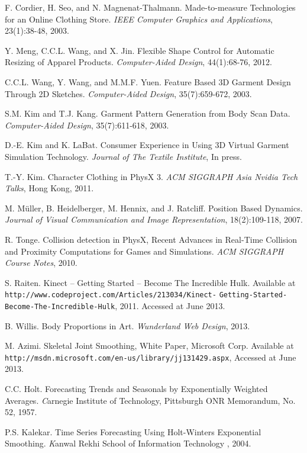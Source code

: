 \documentclass[number,preprint,review,12pt]{elsarticle}
\begin{document}
\begin{thebibliography}{}
F. Cordier, H. Seo, and N. Magnenat-Thalmann.
Made-to-measure Technologies for an Online Clothing Store. 
\textit{IEEE Computer Graphics and Applications}, 23(1):38-48, 2003. 

Y. Meng, C.C.L. Wang, and X. Jin.
Flexible Shape Control for Automatic Resizing of Apparel Products.
\textit{Computer-Aided Design}, 44(1):68-76, 2012. 
    
C.C.L. Wang, Y. Wang, and M.M.F. Yuen.
Feature Based 3D Garment Design Through 2D Sketches.
\textit{Computer-Aided Design}, 35(7):659-672, 2003. 

S.M. Kim and T.J. Kang.
Garment Pattern Generation from Body Scan Data.
\textit{Computer-Aided Design}, 35(7):611-618, 2003. 

D.-E. Kim  and K. LaBat. Consumer Experience in Using 3D Virtual Garment Simulation Technology. 
\textit{Journal of The Textile Institute}, In press.

T.-Y. Kim. Character Clothing in PhysX 3. \textit{ACM SIGGRAPH Asia Nvidia Tech Talks}, Hong Kong, 2011.

M. M\"{u}ller, B. Heidelberger, M. Hennix, and J. Ratcliff. Position Based Dynamics. \textit{Journal of Visual Communication and Image Representation}, 18(2):109-118, 2007.

R. Tonge. Collision detection in PhysX, Recent Advances in Real-Time Collision and Proximity Computations for
Games and Simulations. \textit{ACM SIGGRAPH Course Notes}, 2010.

S. Raiten. Kinect -- Getting Started -- Become The Incredible Hulk. Available at \verb+http://www.codeproject.com/Articles/213034/Kinect-+ \verb+Getting-Started-Become-The-Incredible-Hulk+, 2011. Accessed at June 2013.

B. Willis. Body Proportions in Art. \textit{Wunderland Web Design}, 2013.

M. Azimi. Skeletal Joint Smoothing, White Paper, Microsoft Corp. Available at \verb+http://msdn.microsoft.com/en-us/library/jj131429.aspx+, Accessed at June 2013.

C.C. Holt. Forecasting Trends and Seasonals by Exponentially Weighted Averages. {\textit Carnegie Institute of Technology, Pittsburgh ONR Memorandum}, No. 52, 1957.

P.S. Kalekar. Time Series Forecasting Using Holt-Winters Exponential Smoothing. {\textit Kanwal Rekhi School of Information Technology}
, 2004.


\end{thebibliography}
\end{document}
